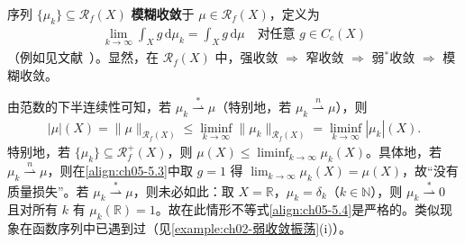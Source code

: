 \documentclass[../../main.tex]{subfiles}%
\begin{document}
\begin{remark}\label{remark:ch05-模糊收敛}
序列 $\{\mu_k\}\subseteq\mathscr{R}_f(X)$ \textbf{模糊收敛}于 $\mu\in\mathscr{R}_f(X)$，定义为
\begin{align*}
\lim_{k\to\infty}\int_X g\,\mathrm{d}\mu_k=\int_X g\,\mathrm{d}\mu
\quad\text{对任意 }g\in C_c(X)
\end{align*}
（例如见文献~\cite{ref42}）。显然，在 $\mathscr{R}_f(X)$ 中，强收敛 $\Rightarrow$ 窄收敛 $\Rightarrow$ 弱$^*$收敛 $\Rightarrow$ 模糊收敛。
\end{remark}

\begin{remark}\label{remark:ch05-范数下半连续}
\label{remark:ch05-5.1.3}
由范数的下半连续性可知，若 $\mu_k\stackrel{*}{\rightharpoonup}\mu$（特别地，若 $\mu_k\stackrel{n}{\rightharpoonup}\mu$），则
\begin{align}
|\mu|(X)=\|\mu\|_{\mathscr{R}_f(X)}
\leqslant\liminf_{k\to\infty}\|\mu_k\|_{\mathscr{R}_f(X)}
=\liminf_{k\to\infty}|\mu_k|(X).\label{align:ch05-5.4}
\end{align}
特别地，若 $\{\mu_k\}\subseteq\mathscr{R}^+_f(X)$，则 $\mu(X)\leqslant\liminf_{k\to\infty}\mu_k(X)$。具体地，若 $\mu_k\stackrel{n}{\rightharpoonup}\mu$，则在\eqref{align:ch05-5.3}中取 $g=1$ 得 $\lim_{k\to\infty}\mu_k(X)=\mu(X)$，故“没有质量损失”。若 $\mu_k\stackrel{*}{\rightharpoonup}\mu$，则未必如此：取 $X=\mathbb{R}$，$\mu_k=\delta_k$（$k\in\mathbb{N}$），则 $\mu_k\stackrel{*}{\rightharpoonup}0$ 且对所有 $k$ 有 $\mu_k(\mathbb{R})=1$。故在此情形不等式\eqref{align:ch05-5.4}是严格的。类似现象在函数序列中已遇到过（见\cref{example:ch02-弱收敛振荡}(i)）。
\end{remark}
\end{document}
